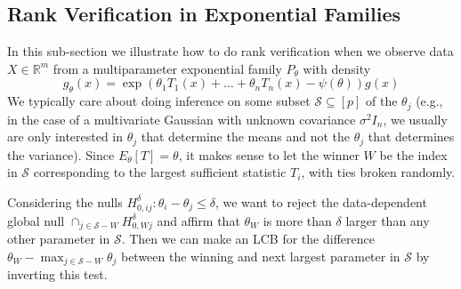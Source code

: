 \documentclass{article}
\newcommand{\R}{\mathbb{R}}
\begin{document}
\subsection{Rank Verification in Exponential Families}

In this sub-section we illustrate how to do rank verification when we observe data $X \in \R^m$ from a multiparameter exponential family $P_{\theta}$ with density
\begin{equation}
    \label{eq:exp_fam}
    g_{\theta}(x) = \exp(\theta_1 T_1(x) + \dots + \theta_n T_n(x) - \psi(\theta))g(x)
\end{equation}
We typically care about doing inference on some subset $\mathcal{S} \subseteq [p]$ of the $\theta_j$ (e.g., in the case of a multivariate Gaussian with unknown covariance $\sigma^2I_n$, we usually are only interested in $\theta_j$ that determine the means and not the $\theta_j$ that determines the variance). Since $E_{\theta}[T] = \theta$, it makes sense to let the winner $W$ be the index in $\mathcal{S}$ corresponding to the largest sufficient statistic $T_i$, with ties broken randomly.

Considering the nulls $H^{\delta}_{0, ij} : \theta_i - \theta_j \leq \delta $, we want to reject the data-dependent global null $\cap_{j \in \mathcal{S} - W} H^{\delta}_{0, Wj} $ and affirm that $\theta_W$ is more than $\delta$ larger than any other parameter in $\mathcal{S}$. Then we can make an LCB for the difference $\theta_W - \max_{j \in \mathcal{S} - W } \theta_j$ between the winning and next largest parameter in $\mathcal{S}$ by inverting this test. 
\end{document}
